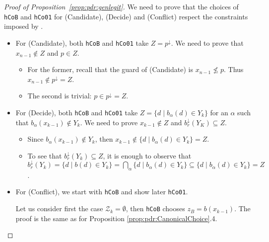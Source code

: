 \begin{proof}[Proof of Proposition~\ref{prop:pdr:genlegit}]
	We need to prove that the choices of \verb|hCoB| and \verb|hCo01| for (Candidate), (Decide) and (Conflict) respect the constraints imposed by {\ADPDR}.

	\begin{itemize}
		\item For (Candidate), both \verb|hCoB| and \verb|hCo01| take $Z = p^\downarrow$. We need to prove that $x_{n-1} \not \in Z$ and $p\in Z$.
		      \begin{itemize}
			      \item For the former, recall that the guard of (Candidate) is $x_{n-1} \not \leq p$. Thus $x_{n-1}\not \in p^\downarrow = Z$.
			      \item The second is trivial: $p\in p^\downarrow =Z$.
		      \end{itemize}

		\item For (Decide), both \verb|hCoB| and \verb|hCo01|  take $Z=\{d\mid b_\alpha(d) \in Y_k\}$ for an $\alpha$ such that $b_\alpha(x_{k-1})\notin Y_k$. We need to prove $x_{k-1}\notin Z$ and $b_r^\downarrow(Y_K)\subseteq Z$.
		      \begin{itemize}
			      \item Since $b_\alpha(x_{k-1})\notin Y_k$, then $x_{k-1}\notin \{d\mid b_\alpha(d) \in Y_k\}=Z$.
			      \item To see that $b_r^\downarrow(Y_k)\subseteq Z$, it is enough to observe that $b^\downarrow_r (Y_k) = \{d \mid b(d) \in Y_k\}
			            = \bigcap_{\alpha}\{d \mid b_{\alpha} (d)\in Y_k\} \subseteq \{d \mid b_{\alpha} (d)\in Y_k\} = Z$.
		      \end{itemize}

		\item For (Conflict), we start with \verb|hCoB| and show later \verb|hCo01|.

		      Let us consider first the case  $\mathcal{Z}_k=\emptyset$, then \verb|hCoB| chooses $z_B=b(x_{k-1})$. The proof is the same as for Proposition \ref{prop:pdr:CanonicalChoice}.4.


\end{itemize}
\end{proof}
